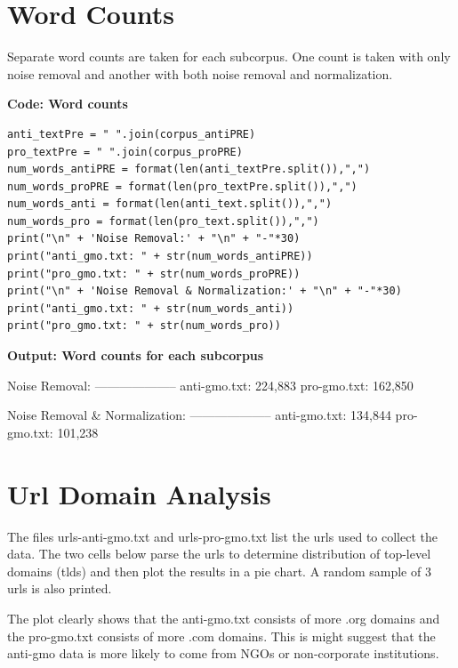 \section{Word Counts}
Separate word counts are taken for each subcorpus. One count is taken with only noise removal and another with both noise removal and normalization. 

\textbf{Code: Word counts}

\begin{lstlisting}
anti_textPre = " ".join(corpus_antiPRE)
pro_textPre = " ".join(corpus_proPRE)
num_words_antiPRE = format(len(anti_textPre.split()),",")
num_words_proPRE = format(len(pro_textPre.split()),",")
num_words_anti = format(len(anti_text.split()),",")
num_words_pro = format(len(pro_text.split()),",")
print("\n" + 'Noise Removal:' + "\n" + "-"*30)  
print("anti_gmo.txt: " + str(num_words_antiPRE))
print("pro_gmo.txt: " + str(num_words_proPRE))
print("\n" + 'Noise Removal & Normalization:' + "\n" + "-"*30)  
print("anti_gmo.txt: " + str(num_words_anti))
print("pro_gmo.txt: " + str(num_words_pro))
\end{lstlisting}

\textbf{Output: Word counts for each subcorpus}
\begin{footnotesize}
Noise Removal:\newline
--------------------\newline
anti-gmo.txt: 224,883\newline
pro-gmo.txt: 162,850

Noise Removal \& Normalization:\newline
--------------------\newline
anti-gmo.txt: 134,844\newline
pro-gmo.txt: 101,238
\end{footnotesize}

\section{Url Domain Analysis}

The files urls-anti-gmo.txt and urls-pro-gmo.txt list the urls used to collect the data. The two cells below parse the urls to determine distribution of top-level domains (tlds) and then plot the results in a pie chart. A random sample of 3 urls is also printed.

The plot clearly shows that the anti-gmo.txt consists of more .org domains and the pro-gmo.txt consists of more .com domains. This is might suggest that the anti-gmo data is more likely to come from NGOs or non-corporate institutions.

